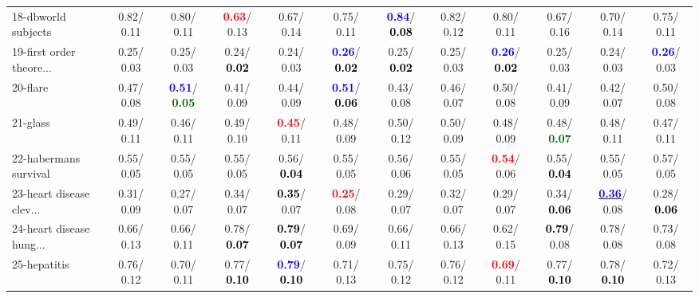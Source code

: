 \begin{table}[h]
\begin{center}
{\begin{tabular}{lc|c|c|c|c|c|c|c|c|c|c}
18-dbworld subjects &   0.82/  0.11 &   0.80/  0.11 & \textcolor{red}{\textbf{  0.63}}/  0.13 &   0.67/  0.14 &   0.75/  0.11 & \textcolor{blue}{\textbf{  0.84}}/\textcolor{black}{\textbf{  0.08}} &   0.82/  0.12 &   0.80/  0.11 &   0.67/  0.16 &   0.70/  0.14 &   0.75/  0.11 \\
19-first order theore... &   0.25/  0.03 &   0.25/  0.03 &   0.24/\textcolor{black}{\textbf{  0.02}} &   0.24/  0.03 & \textcolor{blue}{\textbf{  0.26}}/\textcolor{black}{\textbf{  0.02}} &   0.25/\textcolor{black}{\textbf{  0.02}} &   0.25/  0.03 & \textcolor{blue}{\textbf{  0.26}}/\textcolor{black}{\textbf{  0.02}} &   0.25/  0.03 &   0.24/  0.03 & \textcolor{blue}{\textbf{  0.26}}/  0.03 \\
20-flare &   0.47/  0.08 & \textcolor{blue}{\textbf{  0.51}}/\textcolor{darkgreen}{\textbf{  0.05}} &   0.41/  0.09 &   0.44/  0.09 & \textcolor{blue}{\textbf{  0.51}}/\textcolor{black}{\textbf{  0.06}} &   0.43/  0.08 &   0.46/  0.07 &   0.50/  0.08 &   0.41/  0.09 &   0.42/  0.07 &   0.50/  0.08 \\
21-glass &   0.49/  0.11 &   0.46/  0.11 &   0.49/  0.10 & \textcolor{red}{\textbf{  0.45}}/  0.11 &   0.48/  0.09 &   0.50/  0.12 &   0.50/  0.09 &   0.48/  0.09 &   0.48/\textcolor{darkgreen}{\textbf{  0.07}} &   0.48/  0.11 &   0.47/  0.11 \\ \hline
22-habermans survival &   0.55/  0.05 &   0.55/  0.05 &   0.55/  0.05 &   0.56/\textcolor{black}{\textbf{  0.04}} &   0.55/  0.05 &   0.56/  0.06 &   0.55/  0.05 & \textcolor{red}{\textbf{  0.54}}/  0.06 &   0.55/\textcolor{black}{\textbf{  0.04}} &   0.55/  0.05 &   0.57/  0.05 \\
23-heart disease clev... &   0.31/  0.09 &   0.27/  0.07 &   0.34/  0.07 & \textcolor{black}{\textbf{  0.35}}/  0.07 & \textcolor{red}{\textbf{  0.25}}/  0.08 &   0.29/  0.07 &   0.32/  0.07 &   0.29/  0.07 &   0.34/\textcolor{black}{\textbf{  0.06}} & \underline{\textcolor{blue}{\textbf{  0.36}}}/  0.08 &   0.28/\textcolor{black}{\textbf{  0.06}} \\
24-heart disease hung... &   0.66/  0.13 &   0.66/  0.11 &   0.78/\textcolor{black}{\textbf{  0.07}} & \textcolor{black}{\textbf{  0.79}}/\textcolor{black}{\textbf{  0.07}} &   0.69/  0.09 &   0.66/  0.11 &   0.66/  0.13 &   0.62/  0.15 & \textcolor{black}{\textbf{  0.79}}/  0.08 &   0.78/  0.08 &   0.73/  0.08 \\
25-hepatitis &   0.76/  0.12 &   0.70/  0.11 &   0.77/\textcolor{black}{\textbf{  0.10}} & \textcolor{blue}{\textbf{  0.79}}/\textcolor{black}{\textbf{  0.10}} &   0.71/  0.13 &   0.75/  0.12 &   0.76/  0.12 & \textcolor{red}{\textbf{  0.69}}/  0.11 &   0.77/\textcolor{black}{\textbf{  0.10}} &   0.78/\textcolor{black}{\textbf{  0.10}} &   0.72/  0.13 \\

\end{tabular}}
\end{center}
\end{table}
